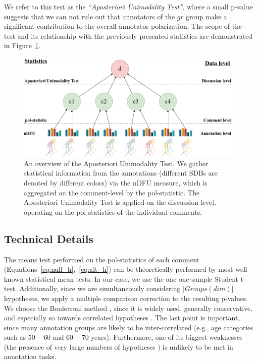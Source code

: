 \documentclass{article}
\newcommand{\sdbdim}{\textit{dim}}
\newcommand{\sdbgroup}{\textit{gr}}
\newcommand{\Sdbgroup}{\textit{Groups}}
\begin{document}
We refer to this test as the \textit{``Aposteriori Unimodality Test''}, where a small p-value suggests that we can not rule out that annotators of the $\sdbgroup$ group make a significant contribution to the overall annotator polarization. The scope of the test and its relationship with the previously presented statistics are demonstrated in Figure~\ref{fig::overview}.

\begin{figure}
	\includegraphics[width=\linewidth]{overview.png}
	\caption{An overview of the Aposteriori Unimodality Test. We gather statistical information from the annotations (different \acp{SDB} are denoted by different colors) via the \ac{nDFU} measure, which is aggregated on the comment-level by the pol-statistic. The Aposteriori Unimodality Test is applied on the discussion level, operating on the pol-statistics of the individual comments.}
	\label{fig::overview}
\end{figure}


\subsection{Technical Details}
\label{ssec:methodology:details}

The means test performed on the pol-statistics of each comment (Equations~\ref{eq:null_h},~\ref{eq:alt_h}) can be theoretically performed by most well-known statistical mean tests. In our case, we use the one one-sample Student t-test. Additionally, since we are simultaneously considering $\lvert \Sdbgroup(\sdbdim) \rvert$ hypotheses, we apply a multiple comparison correction to the resulting p-values. We choose the Bonferroni method \parencite{Bland170}, since it is widely used, generally conservative, and especially so towards correlated hypotheses \parencite{ChenFengYi2017}. The last point is important, since many annotation groups are likely to be inter-correlated (e.g., age categories such as $50-60$ and $60-70$ years). Furthermore, one of its biggest weaknesses (the presence of very large numbers of hypotheses \parencite{ChenFengYi2017}) is unlikely to be met in annotation tasks.
\end{document}
